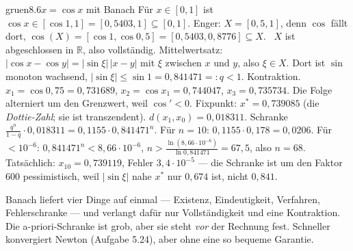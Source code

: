 \begin{loesungkarte}{gruen}{8.6}{$x = \cos x$ mit Banach}
Für $x\in[0, 1]$ ist $\cos x\in[\cos1, 1] = [0{,}5403, 1]\subseteq[0, 1]$. Enger: $X = [0{,}5, 1]$, denn $\cos$ fällt dort, $\cos(X) = [\cos1, \cos0{,}5] = [0{,}5403, 0{,}8776]\subseteq X$. \checkmark\ $X$ ist abgeschlossen in $\mathbb R$, also vollständig.
Mittelwertsatz: $|\cos x - \cos y| = |\sin\xi|\,|x - y|$ mit $\xi$ zwischen $x$ und $y$, also $\xi\in X$. Dort ist $\sin$ monoton wachsend, $|\sin\xi|\le\sin1 = 0{,}841471 =: q < 1$. Kontraktion. \checkmark
{}
$x_1 = \cos0{,}75 = 0{,}731689$, $x_2 = \cos x_1 = 0{,}744047$, $x_3 = 0{,}735734$. Die Folge alterniert um den Grenzwert, weil $\cos' < 0$. Fixpunkt: $x^{*} = 0{,}739085$ (die \emph{Dottie-Zahl}; sie ist transzendent).
$d(x_1, x_0) = 0{,}018311$. Schranke $\frac{q^{n}}{1 - q}\cdot0{,}018311 = 0{,}1155\cdot0{,}841471^{n}$. Für $n = 10$: $0{,}1155\cdot0{,}178 = 0{,}0206$. Für $< 10^{-6}$: $0{,}841471^{n} < 8{,}66\cdot10^{-6}$, $n > \frac{\ln(8{,}66\cdot10^{-6})}{\ln0{,}841471} = 67{,}5$, also $n = 68$. Tatsächlich: $x_{10} = 0{,}739119$, Fehler $3{,}4\cdot10^{-5}$ --- die Schranke ist um den Faktor $600$ pessimistisch, weil $|\sin\xi|$ nahe $x^{*}$ nur $0{,}674$ ist, nicht $0{,}841$.
\begin{mitnehmen}\kastentext
Banach liefert vier Dinge auf einmal --- Existenz, Eindeutigkeit, Verfahren, Fehlerschranke --- und verlangt dafür nur Vollständigkeit und eine Kontraktion. Die a-priori-Schranke ist grob, aber sie steht \emph{vor} der Rechnung fest. Schneller konvergiert Newton (Aufgabe 5.24), aber ohne eine so bequeme Garantie.
\end{mitnehmen}
\end{loesungkarte}


